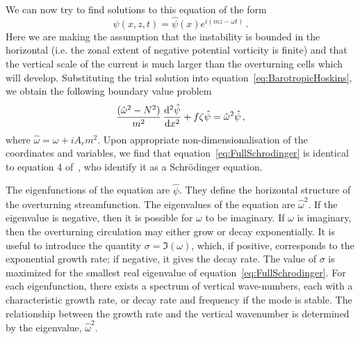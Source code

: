 We can now try to find solutions to this equation of the form
\begin{equation}
    \psi(x, z, t) = \hat{\psi}(x)e^{i(mz - \omega t)} \,.
\end{equation}
Here we are making the assumption that the instability is bounded in the horizontal (i.e. the zonal extent of negative potential vorticity is finite) and that the vertical scale of the current is much larger than the overturning cells which will develop. Substituting the trial solution into equation~\ref{eq:BarotropicHoskins}, we obtain the following boundary value problem
\begin{equation}
    \frac{(\hat{\omega}^2 - N^2 )}{m^2}\, \dv[2]{\hat{\psi}}{x} + f \zeta \hat{\psi} = \hat{\omega}^2 \hat{\psi}\, ,
    \label{eq:FullSchrodinger}
\end{equation}
where $\hat{\omega} = \omega + i A_r m^2$. Upon appropriate non-dimensionalisation of the coordinates and variables, we find that equation~\ref{eq:FullSchrodinger} is identical to equation 4 of~\citet{Plougonven2009}, who identify it as a Schr\"odinger equation.

The eigenfunctions of the equation are $\hat{\psi}$. They define the horizontal structure of the overturning streamfunction. The eigenvalues of the equation are $\hat{\omega}^2$. If the eigenvalue is negative, then it is possible for $\omega$ to be imaginary. If $\omega$ is imaginary, then the overturning circulation may either grow or decay exponentially. It is useful to introduce the quantity $\sigma = \Im(\omega)$, which, if positive, corresponds to the exponential growth rate; if negative, it gives the decay rate. The value of $\sigma$ is maximized for the smallest real eigenvalue of equation~\ref{eq:FullSchrodinger}. For each eigenfunction, there exists a spectrum of vertical wave-numbers, each with a characteristic growth rate, or decay rate and frequency if the mode is stable\footnotemark. The relationship between the growth rate and the vertical wavenumber is determined by the eigenvalue, $\hat{\omega}^2$.


